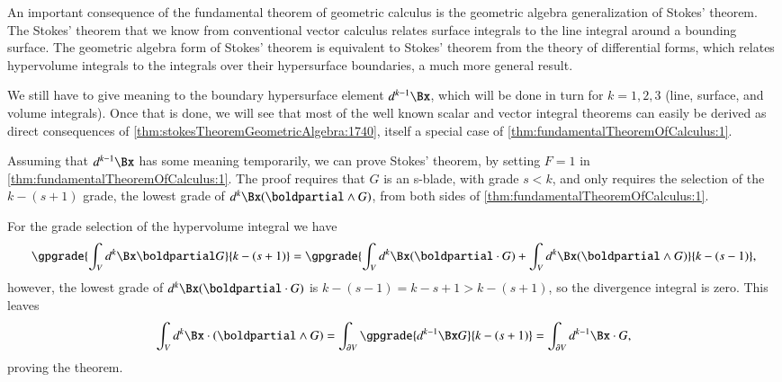 %
%
An important consequence of the fundamental theorem of geometric calculus is the
geometric algebra generalization of Stokes' theorem.
The Stokes' theorem that we know from conventional vector calculus relates
 surface integrals to the line integral around a bounding surface.
The geometric algebra form of Stokes' theorem is equivalent to Stokes' theorem from the theory of differential forms, which relates
hypervolume integrals to the integrals over their hypersurface boundaries, a much more general result.


We still have to give meaning to the boundary hypersurface element \( d^{k-1} \Bx \), which will be done in turn for \( k = 1, 2, 3 \) (line, surface, and volume integrals).
Once that is done, we will see that most of the well known scalar and vector integral theorems can easily be derived as direct consequences of \cref{thm:stokesTheoremGeometricAlgebra:1740}, itself a special case of \cref{thm:fundamentalTheoremOfCalculus:1}.

Assuming that \( d^{k-1} \Bx \) has some meaning temporarily, we can prove Stokes' theorem, by setting \( F = 1 \) in \cref{thm:fundamentalTheoremOfCalculus:1}.
The proof requires that \( G \) is an s-blade, with grade \( s < k \), and only requires the selection of the \( k-(s+1) \) grade, the lowest grade of \( d^k \Bx (\boldpartial \wedge G) \), from both sides of \cref{thm:fundamentalTheoremOfCalculus:1}.

For the grade selection of the hypervolume integral we have
\begin{dmath}\label{eqn:stokesTheoremTheStatement:100}
\gpgrade{ \int_V d^k \Bx \boldpartial G }{k-(s+1)}
=
\gpgrade{
\int_V d^k \Bx (\boldpartial \cdot G )
+
\int_V d^k \Bx (\boldpartial \wedge G )
}{k-(s-1)},
\end{dmath}
however, the lowest grade of \( d^k \Bx (\boldpartial \cdot G ) \) is \( k -(s-1) = k - s + 1 > k - (s+1) \), so the divergence integral is zero.  This leaves
\begin{dmath}\label{eqn:stokesTheoremTheStatement:110}
\int_V d^k \Bx \cdot (\boldpartial \wedge G )
= \int_{\partial V} \gpgrade{d^{k-1} \Bx G}{k-(s+1)}
= \int_{\partial V} d^{k-1} \Bx \cdot G,
\end{dmath}
proving the theorem.

